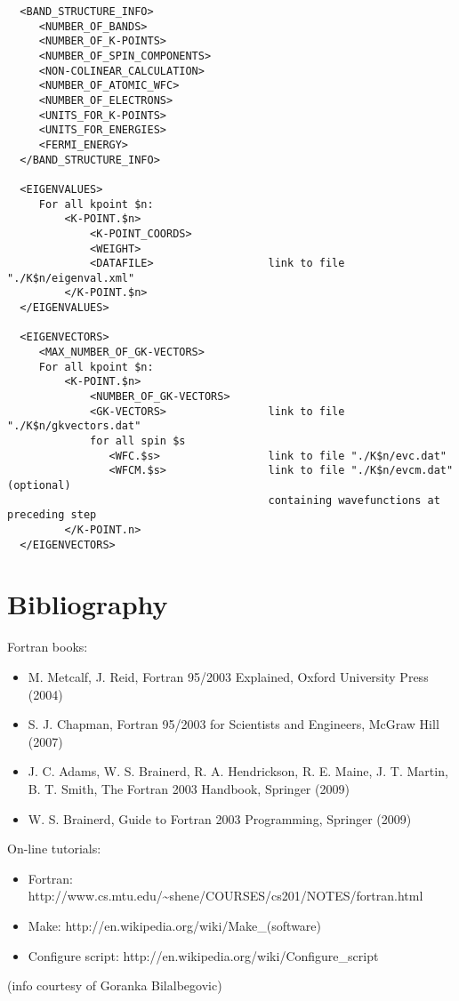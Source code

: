 \documentclass[12pt,a4paper]{article}
\begin{document}
\begin{verbatim}
  <BAND_STRUCTURE_INFO>
     <NUMBER_OF_BANDS>
     <NUMBER_OF_K-POINTS>
     <NUMBER_OF_SPIN_COMPONENTS>
     <NON-COLINEAR_CALCULATION>
     <NUMBER_OF_ATOMIC_WFC>
     <NUMBER_OF_ELECTRONS>
     <UNITS_FOR_K-POINTS>
     <UNITS_FOR_ENERGIES>
     <FERMI_ENERGY>
  </BAND_STRUCTURE_INFO>

  <EIGENVALUES>
     For all kpoint $n:
         <K-POINT.$n>
             <K-POINT_COORDS>
             <WEIGHT>
             <DATAFILE>                  link to file "./K$n/eigenval.xml"
         </K-POINT.$n>
  </EIGENVALUES>

  <EIGENVECTORS>
     <MAX_NUMBER_OF_GK-VECTORS>
     For all kpoint $n:
         <K-POINT.$n>
             <NUMBER_OF_GK-VECTORS>
             <GK-VECTORS>                link to file "./K$n/gkvectors.dat"
             for all spin $s
                <WFC.$s>                 link to file "./K$n/evc.dat"
                <WFCM.$s>                link to file "./K$n/evcm.dat" (optional)
                                         containing wavefunctions at preceding step
         </K-POINT.n>
  </EIGENVECTORS>
\end{verbatim}

\section{Bibliography}

Fortran books:
\begin{itemize}
\item
M. Metcalf, J. Reid, Fortran 95/2003 Explained, Oxford University Press (2004)
\item
S. J. Chapman, Fortran 95/2003 for Scientists and Engineers, McGraw Hill (2007)
\item
J. C. Adams, W. S. Brainerd, R. A. Hendrickson, R. E. Maine, J. T. Martin,
B. T. Smith, The Fortran 2003 Handbook, Springer (2009)
\item
W. S. Brainerd, Guide to Fortran 2003 Programming, Springer (2009)
\end{itemize}
On-line tutorials:
\begin{itemize}
\item Fortran:
http://www.cs.mtu.edu/\~{}shene/COURSES/cs201/NOTES/fortran.html
\item Make:
http://en.wikipedia.org/wiki/Make\_(software)
\item Configure script:
http://en.wikipedia.org/wiki/Configure\_script
\end{itemize}
(info courtesy of Goranka Bilalbegovic)
\end{document}
